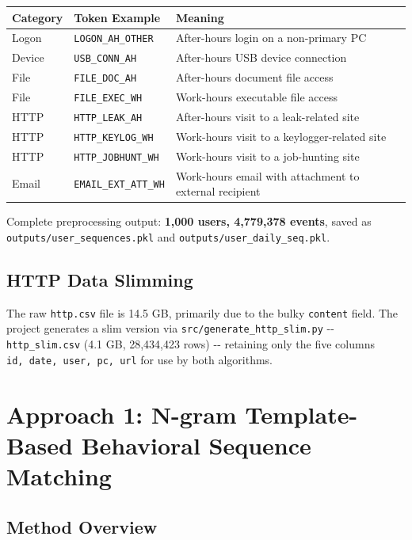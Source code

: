 \documentclass[
  a4paper,
  11pt]{article}
\newcounter{none} %
\begin{document}
{\def\LTcaptype{none} %
\begin{longtable}[]{@{}L{0.24}L{0.26}L{0.42}@{}}
\toprule\noalign{}
Category & Token Example & Meaning \\
\midrule\noalign{}
\endhead
\bottomrule\noalign{}
\endlastfoot
Logon & \texttt{LOGON\_AH\_OTHER} & After-hours login on a non-primary
PC \\
Device & \texttt{USB\_CONN\_AH} & After-hours USB device connection \\
File & \texttt{FILE\_DOC\_AH} & After-hours document file access \\
File & \texttt{FILE\_EXEC\_WH} & Work-hours executable file access \\
HTTP & \texttt{HTTP\_LEAK\_AH} & After-hours visit to a leak-related
site \\
HTTP & \texttt{HTTP\_KEYLOG\_WH} & Work-hours visit to a
keylogger-related site \\
HTTP & \texttt{HTTP\_JOBHUNT\_WH} & Work-hours visit to a job-hunting
site \\
Email & \texttt{EMAIL\_EXT\_ATT\_WH} & Work-hours email with attachment
to external recipient \\
\end{longtable}
}

Complete preprocessing output: \textbf{1,000 users, 4,779,378 events},
saved as \texttt{outputs/user\_sequences.pkl} and
\texttt{outputs/user\_daily\_seq.pkl}.

\subsection{HTTP Data Slimming}\label{http-data-slimming}

The raw \texttt{http.csv} file is 14.5 GB, primarily due to the bulky
\texttt{content} field. The project generates a slim version via
\texttt{src/generate\_http\_slim.py} -\/- \texttt{http\_slim.csv} (4.1
GB, 28,434,423 rows) -\/- retaining only the five columns
\texttt{id,\ date,\ user,\ pc,\ url} for use by both algorithms.

\section{Approach 1: N-gram Template-Based Behavioral Sequence
Matching}\label{approach-1-n-gram-template-based-behavioral-sequence-matching}

\subsection{Method Overview}\label{method-overview}
\end{document}

